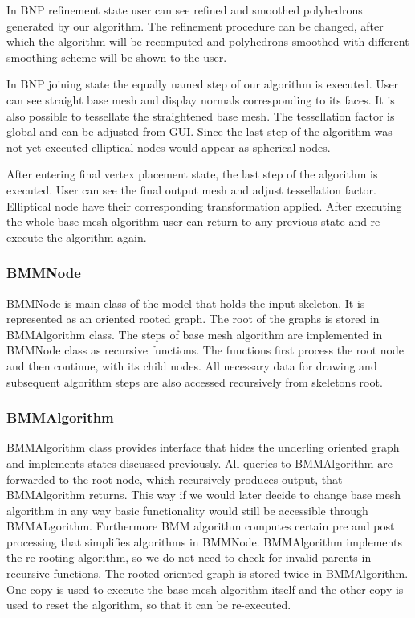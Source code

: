 In BNP refinement state user can see refined and smoothed polyhedrons generated by our algorithm.
The refinement procedure can be changed, after which the algorithm will be recomputed and polyhedrons smoothed with different smoothing scheme will be shown to the user.

In BNP joining state the equally named step of our algorithm is executed.
User can see straight base mesh and display normals corresponding to its faces.
It is also possible to tessellate the straightened base mesh.
The tessellation factor is global and can be adjusted from GUI.
Since the last step of the algorithm was not yet executed elliptical nodes would appear as spherical nodes.

After entering final vertex placement state, the last step of the algorithm is executed.
User can see the final output mesh and adjust tessellation factor.
Elliptical node have their corresponding transformation applied.
After executing the whole base mesh algorithm user can return to any previous state and re-execute the algorithm again.

\subsubsection{BMMNode}

BMMNode is main class of the model that holds the input skeleton.
It is represented as an oriented rooted graph.
The root of the graphs is stored in BMMAlgorithm class.
The steps of base mesh algorithm are implemented in BMMNode class as recursive functions.
The functions first process the root node and then continue, with its child nodes.
All necessary data for drawing and subsequent algorithm steps are also accessed recursively from skeletons root.

\subsubsection{BMMAlgorithm}

BMMAlgorithm class provides interface that hides the underling oriented graph and implements states discussed previously.
All queries to BMMAlgorithm are forwarded to the root node, which recursively produces output, that BMMAlgorithm returns.
This way if we would later decide to change base mesh algorithm in any way basic functionality would still be accessible through BMMALgorithm.
Furthermore BMM algorithm computes certain pre and post processing that simplifies algorithms in BMMNode.
BMMAlgorithm implements the re-rooting algorithm, so we do not need to check for invalid parents in recursive functions.
The rooted oriented graph is stored twice in BMMAlgorithm.
One copy is used to execute the base mesh algorithm itself and the other copy is used to reset the algorithm, so that it can be re-executed.

